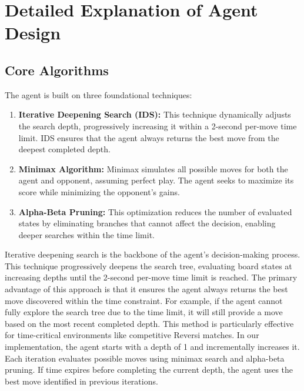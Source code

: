 \documentclass[11pt]{article}
\begin{document}
\section*{Detailed Explanation of Agent Design}
\subsection*{Core Algorithms}
The agent is built on three foundational techniques:
\begin{enumerate}
    \item \textbf{Iterative Deepening Search (IDS):} This technique dynamically adjusts the search depth, progressively increasing it within a 2-second per-move time limit. IDS ensures that the agent always returns the best move from the deepest completed depth.
    \item \textbf{Minimax Algorithm:} Minimax simulates all possible moves for both the agent and opponent, assuming perfect play. The agent seeks to maximize its score while minimizing the opponent's gains.
    \item \textbf{Alpha-Beta Pruning:} This optimization reduces the number of evaluated states by eliminating branches that cannot affect the decision, enabling deeper searches within the time limit.
\end{enumerate}

Iterative deepening search is the backbone of the agent's decision-making process. This technique progressively deepens the search tree, evaluating board states at increasing depths until the 2-second per-move time limit is reached. The primary advantage of this approach is that it ensures the agent always returns the best move discovered within the time constraint. For example, if the agent cannot fully explore the search tree due to the time limit, it will still provide a move based on the most recent completed depth. This method is particularly effective for time-critical environments like competitive Reversi matches. In our implementation, the agent starts with a depth of 1 and incrementally increases it. Each iteration evaluates possible moves using minimax search and alpha-beta pruning. If time expires before completing the current depth, the agent uses the best move identified in previous iterations.
\end{document}
